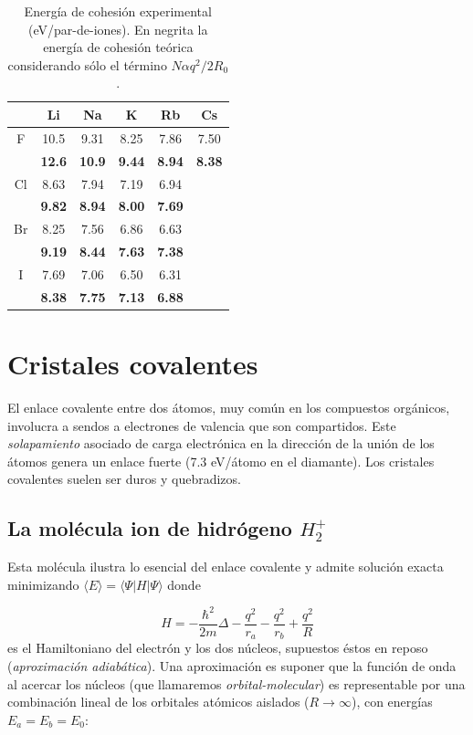 \begin{table}[h!] \centering
    \begin{tabular}{c|ccccc}
        & Li & Na & K & Rb & Cs \\ \hline
        F & 10.5 & 9.31 & 8.25 & 7.86 & 7.50 \\
          & \textbf{12.6} & \textbf{10.9} & \textbf{9.44} & \textbf{8.94} & \textbf{8.38} \\ \hline
        Cl & 8.63  & 7.94 & 7.19 & 6.94 & \\
           & \textbf{9.82} & \textbf{8.94} & \textbf{8.00} & \textbf{7.69} & \\ \hline  
        Br & 8.25 & 7.56 & 6.86 & 6.63 & \\
           & \textbf{9.19} & \textbf{8.44} & \textbf{7.63} & \textbf{7.38} & \\ \hline
        I & 7.69 & 7.06 & 6.50 & 6.31 & \\
        & \textbf{8.38} & \textbf{7.75} & \textbf{7.13} & \textbf{6.88} &  
    \end{tabular}
    \caption{Energía de cohesión experimental (eV/par-de-iones). En negrita la energía de cohesión teórica considerando sólo el término $N\alpha q^2 / 2 R_0$.}
\end{table}

\section{Cristales covalentes}

El enlace covalente entre dos átomos, muy común en los compuestos orgánicos, involucra a sendos a electrones de valencia  que son compartidos. Este \textit{solapamiento} asociado de carga electrónica en la dirección de la unión de los átomos genera un enlace fuerte (7.3 eV/átomo en el diamante). Los cristales covalentes suelen ser duros y quebradizos.

\subsection{La molécula ion de hidrógeno $H_2^+$}

Esta molécula ilustra lo esencial del enlace covalente y admite solución exacta minimizando $\langle E \rangle = \langle \Psi | H | \Psi \rangle$ donde 

\begin{equation*}
    H = - \frac{\hbar^2}{2m} \Delta - \frac{q^2}{r_a} - \frac{q^2}{r_b} + \frac{q^2}{R}
\end{equation*}
es el Hamiltoniano del electrón y los dos núcleos, supuestos éstos en reposo (\textit{aproximación adiabática}). Una aproximación es suponer que la función de onda al acercar los núcleos (que llamaremos \textit{orbital-molecular}) es representable por una combinación lineal de los orbitales atómicos aislados ($R \rightarrow \infty$), con energías $E_a = E_b = E_0$:

